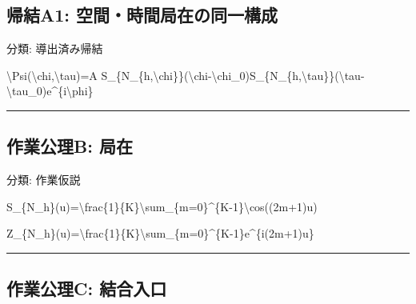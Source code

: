 \documentclass[
  a4paper,
]{ltjsarticle}
\newenvironment{Shaded}{}{}
\newcommand{\NormalTok}[1]{#1}
\begin{document}
\subsection{帰結A1:
空間・時間局在の同一構成}\label{ux5e30ux7d50a1-ux7a7aux9593ux6642ux9593ux5c40ux5728ux306eux540cux4e00ux69cbux6210}

分類: 導出済み帰結

\begin{Shaded}
\begin{Highlighting}[]
\NormalTok{\textbackslash{}Psi(\textbackslash{}chi,\textbackslash{}tau)=A S\_\{N\_\{h,\textbackslash{}chi\}\}(\textbackslash{}chi{-}\textbackslash{}chi\_0)S\_\{N\_\{h,\textbackslash{}tau\}\}(\textbackslash{}tau{-}\textbackslash{}tau\_0)e\^{}\{i\textbackslash{}phi\}}
\end{Highlighting}
\end{Shaded}

\begin{center}\rule{0.5\linewidth}{0.5pt}\end{center}

\subsection{作業公理B:
局在}\label{ux4f5cux696dux516cux7406b-ux5c40ux5728}

分類: 作業仮説

\begin{Shaded}
\begin{Highlighting}[]
\NormalTok{S\_\{N\_h\}(u)=\textbackslash{}frac\{1\}\{K\}\textbackslash{}sum\_\{m=0\}\^{}\{K{-}1\}\textbackslash{}cos((2m+1)u)}
\end{Highlighting}
\end{Shaded}

\begin{Shaded}
\begin{Highlighting}[]
\NormalTok{Z\_\{N\_h\}(u)=\textbackslash{}frac\{1\}\{K\}\textbackslash{}sum\_\{m=0\}\^{}\{K{-}1\}e\^{}\{i(2m+1)u\}}
\end{Highlighting}
\end{Shaded}

\begin{center}\rule{0.5\linewidth}{0.5pt}\end{center}

\subsection{作業公理C:
結合入口}\label{ux4f5cux696dux516cux7406c-ux7d50ux5408ux5165ux53e3}
\end{document}
